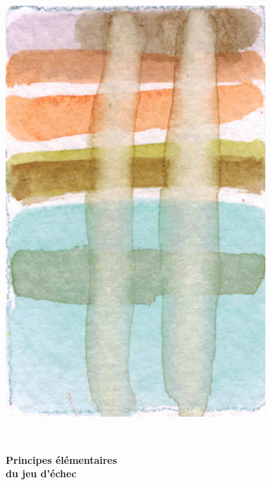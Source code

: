 \begin{titlepage}
%
~\\[1cm]

\begin{center}
\includegraphics[scale=2]{./presentation/champ06}
\end{center}

\textsc{\Large }\\[0.5cm]

\HRule

\begin{center}
{\huge \bfseries  Principes élémentaires\\
du jeu d'échec\\[0.4cm] }
\end{center}

\HRule \\[1.5cm]

\begin{center}
\end{center}

\begin{center}
\end{center}



\end{titlepage}
